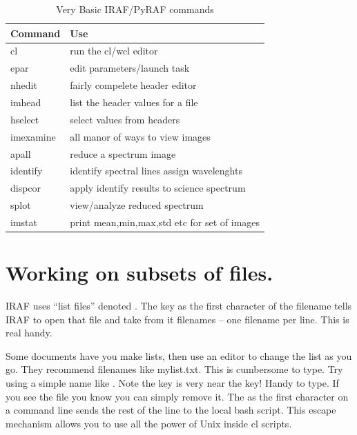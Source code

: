 \begin{table}[h!]
\centering
\begin{tabular}{| l | l |}
\hline
Command  & Use   \\
\hline
cl            & run the cl/wcl editor                        \\
epar          & edit parameters/launch task                  \\
nhedit        & fairly compelete header editor               \\ 
imhead        & list the header values for a file            \\ 
hselect       & select values from headers                   \\ 
imexamine     & all manor of ways to view images             \\ 
apall         & reduce a spectrum image                      \\ 
identify      & identify spectral lines assign wavelenghts   \\
dispcor       & apply identify results to science spectrum   \\
splot         & view/analyze reduced spectrum                \\ 
imstat        & print mean,min,max,std etc for set of images \\ 
\hline
\end{tabular}
\caption{Very Basic IRAF/PyRAF commands}
\label{table:VeryBasicIRAF/PyRAFcommands}
\end{table}


\section{Working on subsets of files.}

IRAF uses ``list files'' denoted . The  key
as the first character of the filename tells IRAF to open that
file and take from it filenames -- one filename per line. This is
real handy.

Some documents have you make lists, then use an editor to change the
list as you go. They recommend filenames like mylist.txt. This is
cumbersome to type. Try using a simple name like . Note the
 key is very near the  key! Handy to type.  If you
see the file  you know you can simply remove it.  The \llbox{!}
as the first character on a command line sends the rest of the line
to the local bash script. This escape mechanism allows you to use
all the power of Unix inside cl scripts.


